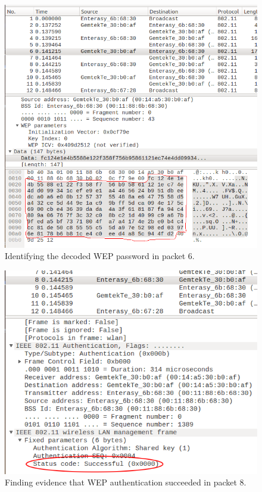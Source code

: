 \documentclass{article}
\begin{document}
\begin{figure}
\begin{mdframed}
\includegraphics[scale=0.4]{Step_1d.png}
\caption{Identifying the decoded WEP password in packet 6.}
\label{fig:step1d}
\end{mdframed}
\end{figure}

\begin{figure}
\begin{mdframed}
\includegraphics[scale=0.5]{Step_1e.png}
\caption{Finding evidence that WEP authentication succeeded in packet 8.}
\label{fig:step1e}
\end{mdframed}
\end{figure}
\end{document}

